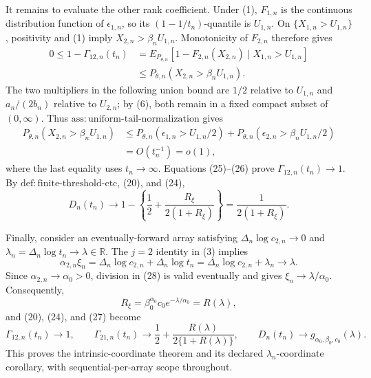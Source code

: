 It remains to evaluate the other rank coefficient. Under (1), \(F_{1,n}\) is the continuous distribution function of \(\epsilon_{1,n}\), so its \((1-1/t_n)\)-quantile is \(U_{1,n}\). On \(\{X_{1,n}>U_{1,n}\}\), positivity and (1) imply \(X_{2,n}>\beta_nU_{1,n}\). Monotonicity of \(F_{2,n}\) therefore gives
\[
\begin{aligned}
0\leq1-\Gamma_{12,n}(t_n)
&=E_{P_{\theta,n}}[1-F_{2,n}(X_{2,n})\mid X_{1,n}>U_{1,n}]\\
&\leq P_{\theta,n}(X_{2,n}>\beta_nU_{1,n}).
\end{aligned}
\tag{25}
\]
The two multipliers in the following union bound are \(1/2\) relative to \(U_{1,n}\) and \(a_n/(2b_n)\) relative to \(U_{2,n}\); by (6), both remain in a fixed compact subset of \((0,\infty)\). Thus \(\mathrm{ass{:}uniform\text{-}tail\text{-}normalization}\) gives
\[
\begin{aligned}
P_{\theta,n}(X_{2,n}>\beta_nU_{1,n})
&\leq P_{\theta,n}(\epsilon_{1,n}>U_{1,n}/2)
+P_{\theta,n}(\epsilon_{2,n}>\beta_nU_{1,n}/2)\\
&=O(t_n^{-1})=o(1),
\end{aligned}
\tag{26}
\]
where the last equality uses \(t_n\to\infty\). Equations (25)--(26) prove \(\Gamma_{12,n}(t_n)\to1\). By \(\mathrm{def{:}finite\text{-}threshold\text{-}ctc}\), (20), and (24),
\[
D_n(t_n)
\longrightarrow
1-\left\{\frac12+\frac{R_\xi}{2(1+R_\xi)}\right\}
=\frac{1}{2(1+R_\xi)}.
\tag{27}
\]

Finally, consider an eventually-forward array satisfying \(\Delta_n\log c_{2,n}\to0\) and \(\lambda_n=\Delta_n\log t_n\to\lambda\in\mathbb R\). The \(j=2\) identity in (3) implies
\[
\alpha_{2,n}\xi_n
=\Delta_n\log c_{2,n}+\Delta_n\log t_n
=\Delta_n\log c_{2,n}+\lambda_n
\longrightarrow\lambda.
\tag{28}
\]
Since \(\alpha_{2,n}\to\alpha_0>0\), division in (28) is valid eventually and gives \(\xi_n\to\lambda/\alpha_0\). Consequently,
\[
R_\xi
=\beta_0^{\alpha_0}c_0e^{-\lambda/\alpha_0}
=R(\lambda),
\tag{29}
\]
and (20), (24), and (27) become
\[
\Gamma_{12,n}(t_n)\to1,
\qquad
\Gamma_{21,n}(t_n)\to\frac12+\frac{R(\lambda)}{2\{1+R(\lambda)\}},
\qquad
D_n(t_n)\to g_{\alpha_0,\beta_0,c_0}(\lambda).
\]
This proves the intrinsic-coordinate theorem and its declared \(\lambda_n\)-coordinate corollary, with sequential-per-array scope throughout.